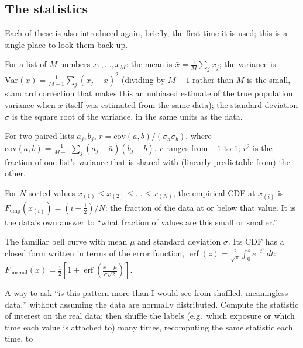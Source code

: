 \documentclass[11pt,a4paper]{article}
\newcommand{\erf}{\operatorname{erf}}
\begin{document}
\subsection{The statistics}

Each of these is also introduced again, briefly, the first time it is used;
this is a single place to look them back up.

\begin{description}[leftmargin=2.2cm,style=nextline]
\item[Mean, variance, standard deviation] For a list of $M$ numbers $x_1,
  \dots, x_M$: the mean is $\bar{x} = \frac{1}{M}\sum_j x_j$; the variance
  is $\mathrm{Var}(x) = \frac{1}{M-1}\sum_j (x_j - \bar x)^2$ (dividing by
  $M-1$ rather than $M$ is the small, standard correction that makes this
  an unbiased estimate of the true population variance when $\bar x$ itself
  was estimated from the same data); the standard deviation $\sigma$ is the
  square root of the variance, in the same units as the data.
\item[Pearson correlation coefficient, $r$] For two paired lists $a_j,
  b_j$, $r = \mathrm{cov}(a,b) / (\sigma_a \sigma_b)$, where
  $\mathrm{cov}(a,b) = \frac{1}{M-1}\sum_j (a_j - \bar a)(b_j - \bar b)$.
  $r$ ranges from $-1$ to $1$; $r^2$ is the fraction of one list's variance
  that is shared with (linearly predictable from) the other.
\item[Empirical cumulative distribution function (CDF)] For $N$ sorted
  values $x_{(1)} \le x_{(2)} \le \dots \le x_{(N)}$, the empirical CDF at
  $x_{(i)}$ is $F_{\mathrm{emp}}(x_{(i)}) = (i - \tfrac12)/N$: the fraction
  of the data at or below that value. It is the data's own answer to ``what
  fraction of values are this small or smaller.''
\item[Normal (Gaussian) distribution and $\erf$] The familiar bell curve
  with mean $\mu$ and standard deviation $\sigma$. Its CDF has a closed
  form written in terms of the error function, $\erf(z) = \frac{2}{\sqrt\pi}
  \int_0^z e^{-t^2}\,dt$: $F_{\mathrm{normal}}(x) = \frac12\left[1 +
  \erf\!\left(\frac{x - \mu}{\sigma\sqrt2}\right)\right]$.
\item[Permutation test] A way to ask ``is this pattern more than I would
  see from shuffled, meaningless data,'' without assuming the data are
  normally distributed. Compute the statistic of interest on the real data;
  then shuffle the labels (e.g.\ which exposure or which time each value is
  attached to) many times, recomputing the same statistic each time, to

\end{description}
\end{document}
